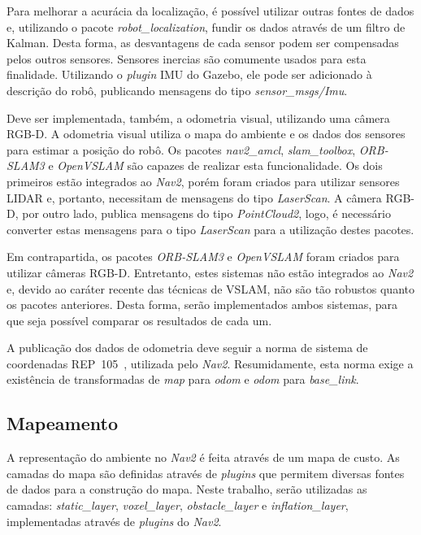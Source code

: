 \documentclass[repeatfields,xlists,xpacks,oneside,yearsonly]{ufrgscca}
\begin{document}
Para melhorar a acurácia da localização, é possível utilizar outras fontes de
dados e, utilizando o pacote \textit{robot\_localization}, fundir os dados
através de um filtro de Kalman.
Desta forma, as desvantagens de cada sensor podem ser compensadas pelos outros
sensores.
Sensores inercias são comumente usados para esta finalidade.
Utilizando o \textit{plugin} IMU do Gazebo, ele pode ser adicionado à descrição
do robô, publicando mensagens do tipo \textit{sensor\_msgs/Imu}.


Deve ser implementada, também, a odometria visual, utilizando uma câmera RGB-D.
A odometria visual utiliza o mapa do ambiente e os dados dos sensores para estimar
a posição do robô.
Os pacotes \textit{nav2\_amcl}, \textit{slam\_toolbox}, \textit{ORB-SLAM3}
e \textit{OpenVSLAM} são capazes de realizar esta funcionalidade.
Os dois primeiros estão integrados ao \textit{Nav2},
porém foram criados para utilizar sensores LIDAR e, portanto,
necessitam de mensagens do tipo \textit{LaserScan}.
A câmera RGB-D, por outro lado, publica mensagens do tipo \textit{PointCloud2},
logo, é necessário converter estas mensagens para o tipo \textit{LaserScan}
para a utilização destes pacotes.

Em contrapartida, os pacotes \textit{ORB-SLAM3} e \textit{OpenVSLAM} foram
criados para utilizar câmeras RGB-D. Entretanto, estes sistemas não estão
integrados ao \textit{Nav2} e, devido ao caráter recente das técnicas de
VSLAM, não são tão robustos quanto os pacotes anteriores.
Desta forma, serão implementados ambos sistemas, para que seja possível
comparar os resultados de cada um.

A publicação dos dados de odometria deve seguir a norma de sistema de coordenadas
REP~105~\cite{rep_105}, utilizada pelo \textit{Nav2}.
Resumidamente, esta norma exige a existência de transformadas de \textit{map}
para \textit{odom} e \textit{odom} para \textit{base\_link}.

\subsection{Mapeamento}

A representação do ambiente no \textit{Nav2} é feita através de um mapa de custo.
As camadas do mapa são definidas através de \textit{plugins} que permitem
diversas fontes de dados para a construção do mapa.
Neste trabalho, serão utilizadas as camadas: \textit{static\_layer},
\textit{voxel\_layer}, \textit{obstacle\_layer} e \textit{inflation\_layer},
implementadas através de \textit{plugins} do \textit{Nav2}.
\end{document}
